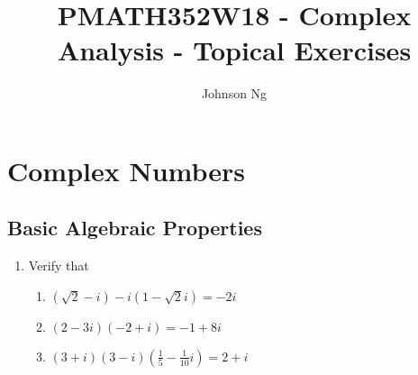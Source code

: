 \documentclass[11pt, oneside]{book}
\title{PMATH352W18 - Complex Analysis - Topical Exercises}
\author{Johnson Ng}
\begin{document}
\hypersetup{pageanchor=false}
\maketitle
\hypersetup{pageanchor=true}
\tableofcontents

\chapter{Complex Numbers}
	\label{chapter:complex_numbers}

\section{Basic Algebraic Properties} %
\label{sec:basic_algebraic_properties}

\begin{enumerate}
	\item Verify that
	\begin{enumerate}
		\item $(\sqrt{2} - i) - i (1 - \sqrt{2}i) = -2i$
		\item $(2 - 3i)(-2 + i) = -1 + 8i$
		\item $(3 + i)(3 - i)(\frac{1}{5} - \frac{1}{10} i) = 2 + i$
	\end{enumerate}
\end{enumerate}


\end{document}
